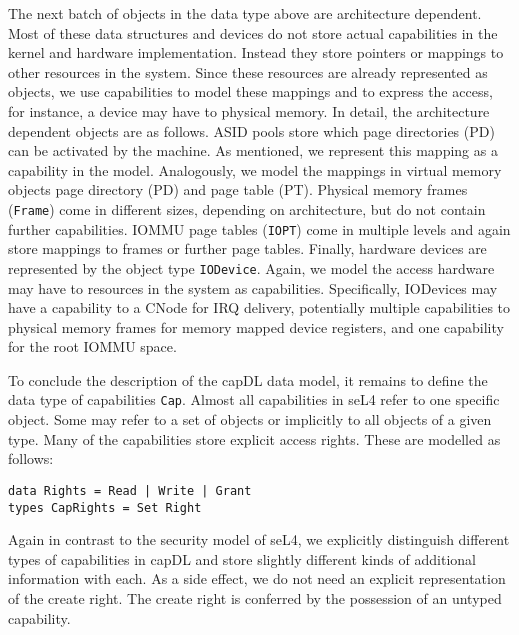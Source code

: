 \documentclass[a4paper,11pt]{article}
\begin{document}
The next batch of objects in the data type above are architecture dependent. Most of these data structures and devices do not store actual capabilities in the kernel and hardware implementation. Instead they store pointers or mappings to other resources in the system. Since these resources are already represented as objects, we use capabilities to model these mappings and to express the access, for instance, a device may have to physical memory. In detail, the architecture dependent objects are as follows. ASID pools store which page directories (PD) can be activated by the machine. As mentioned, we represent this mapping as a capability in the model. Analogously, we model the mappings in virtual memory objects page directory (PD) and page table (PT). Physical memory frames (\texttt{Frame}) come in different sizes, depending on architecture, but do not contain further capabilities. IOMMU page tables (\texttt{IOPT}) come in multiple levels and again store mappings to frames or further page tables. Finally, hardware devices are represented by the object type \texttt{IODevice}. Again, we model the access hardware may have to resources in the system as capabilities. Specifically, IODevices may have a capability to a CNode for IRQ delivery, potentially multiple capabilities to physical memory frames for memory mapped device registers, and one capability for the root IOMMU space. 

To conclude the description of the capDL data model, it remains to define the data type of capabilities \texttt{Cap}. Almost all capabilities in seL4 refer to one specific object. Some may refer to a set of objects or implicitly to all objects of a given type. Many of the capabilities store explicit access rights. These are modelled as follows:

\begin{verbatim}
data Rights = Read | Write | Grant
types CapRights = Set Right
\end{verbatim}

Again in contrast to the security model of seL4, we explicitly distinguish different types of capabilities in capDL and store slightly different kinds of additional information with each. As a side effect, we do not need an explicit representation of the create right. The create right is conferred by the possession of an untyped capability.
\end{document}

